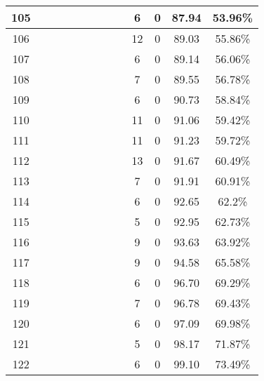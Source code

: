 \begin{longtable}{|c|c|c|c|c|c|c|c|c|c|c|c|c|}
105 &  \x    & \x    &       & \x    &       &       &       &       & 6 & 0 & 87.94 & 53.96\% \\ \hline
106 &  \x    & \x    &       &       &       &       &       &       & 12 & 0 & 89.03 & 55.86\% \\ \hline
107 &  \x    & \x    & \x    &       &       & \x    & \x\m  &       & 6 & 0 & 89.14 & 56.06\% \\ \hline
108 &  \x    & \x    & \x    & \x    &       &       &       & \x    & 7 & 0 & 89.55 & 56.78\% \\ \hline
109 &  \x    & \x    &       &       & \x    & \x    & \x    &       & 6 & 0 & 90.73 & 58.84\% \\ \hline
110 &  \x    & \x    &       & \x    & \x\m  &       &       &       & 11 & 0 & 91.06 & 59.42\% \\ \hline
111 &  \x    & \x    &       &       & \x\m  &       &       &       & 11 & 0 & 91.23 & 59.72\% \\ \hline
112 &  \x    & \x    &       &       &       &       &       & \x\m  & 13 & 0 & 91.67 & 60.49\% \\ \hline
113 &  \x    & \x    & \x    &       &       & \x\m  &       & \x\m  & 7 & 0 & 91.91 & 60.91\% \\ \hline
114 &  \x    & \x    & \x    &       &       & \x\m  & \x\m  &       & 6 & 0 & 92.65 & 62.2\% \\ \hline
115 &  \x    & \x    &       & \x    & \x    & \x    &       & \x    & 5 & 0 & 92.95 & 62.73\% \\ \hline
116 &  \x    & \x    & \x    &       &       &       & \x\m  &       & 9 & 0 & 93.63 & 63.92\% \\ \hline
117 &  \x    & \x    & \x    &       &       & \x\m  & \x    &       & 9 & 0 & 94.58 & 65.58\% \\ \hline
118 &  \x    & \x    &       &       &       &       &       & \x    & 6 & 0 & 96.70 & 69.29\% \\ \hline
119 &  \x    & \x    &       &       &       & \x\m  &       &       & 7 & 0 & 96.78 & 69.43\% \\ \hline
120 &  \x    & \x    &       &       & \x    &       &       & \x    & 6 & 0 & 97.09 & 69.98\% \\ \hline
121 &  \x    & \x    &       & \x    & \x    & \x    & \x    &       & 5 & 0 & 98.17 & 71.87\% \\ \hline
122 &  \x    & \x    &       &       & \x    & \x    &       & \x    & 6 & 0 & 99.10 & 73.49\% \\ \hline

\end{longtable}
